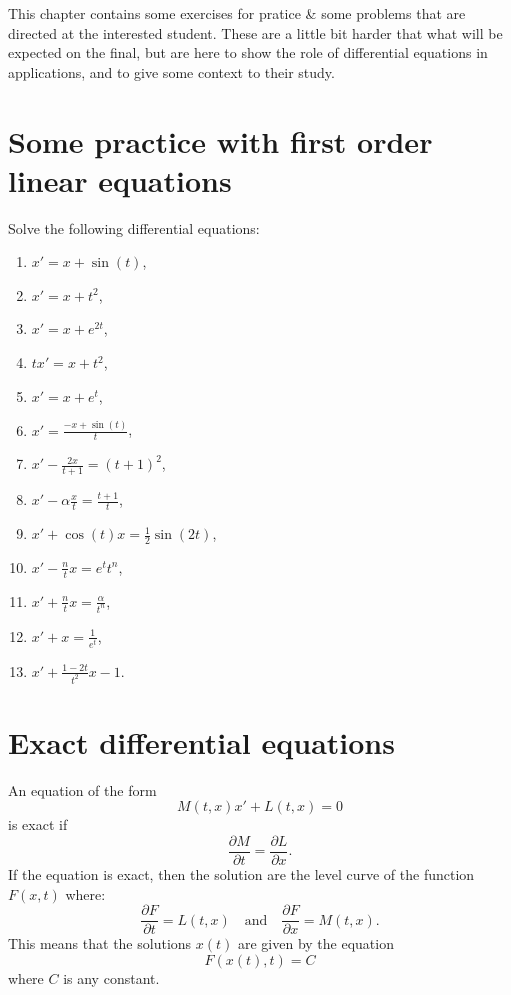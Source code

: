 This chapter contains some exercises for pratice \& some problems that are directed at the interested student. These are a little bit harder that what will be expected on the final, but are here to show the role of differential equations in applications, and to give some context to their study.

\section{Some practice with first order linear equations}

Solve the following differential equations:
\begin{enumerate}
\item $x' = x+\sin (t)$,
\item $x' = x+t^2$,
\item $x' = x+ e^{2t}$,
\item $tx' = x+ t^2$,
\item $x' = x+e^t$,
\item $x' = \frac{-x+\sin (t)}{t}$,
\item $x' -\frac{2x}{t+1}= (t+1)^2$,
\item $x' - \alpha \frac{x}{t} = \frac{t+1}{t}$,
\item $x' + \cos (t) x = \frac{1}{2}\sin (2t) $,
\item $ x' - \frac{n}{t} x =e^t t^n$,
\item $ x' + \frac{n}{t} x = \frac{\alpha}{t^n}$,
\item $x' + x = \frac{1}{e^t}$,
\item $x' + \frac{1-2t}{t^2}x -1$.
\end{enumerate}

\section{Exact differential equations}

An equation of the form
\[M(t,x)x' + L(t,x)=0\]
is exact if 
\[ \frac{\partial M}{\partial t} = \frac{\partial L}{\partial x}. \]
If the equation is exact, then the solution are the level curve of the function $F(x,t)$ where:
\[ \frac{\partial F}{\partial t} = L(t,x) \quad \text{and} \quad \frac{\partial F}{\partial x} = M(t,x).\]
This means that the solutions $x(t)$ are given by the equation \[F(x(t),t)= C\]
where $C$ is any constant. \\

